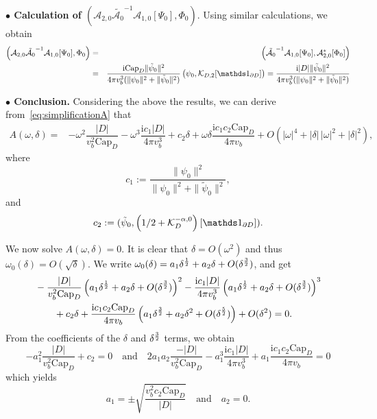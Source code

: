 \documentclass[11pt]{article}
\numberwithin{equation}{section}
\def\ri{{\mathrm{i}}}
\def\capacity{{\mathrm{Cap}}}
\newcommand\1{{\ensuremath {\mathds 1} }}
\def\beas{\begin{eqnarray*}} \def\eeas{\end{eqnarray*}}
\begin{document}
{{\noindent \textbf{$\bullet$ Calculation of  $\left( \mathcal{A}_{2,0}\tilde{\mathcal{A}_0}^{-1}\mathcal{A}_{1,0}[\Psi_0], \Phi_0\right)$}. Using similar calculations, we obtain
\beas
\left( \mathcal{A}_{2,0}\tilde{\mathcal{A}_0}^{-1}\mathcal{A}_{1,0}[\Psi_0], \Phi_0\right) 
&=& \left( \tilde{\mathcal{A}_0}^{-1}\mathcal{A}_{1,0}[\Psi_0], \mathcal{A}_{2,0}^* [\Phi_0]\right) \\
&=&   \f{\ri \capacity_D\|\tilde\psi_0\|^2}{4 \pi v_b^3(\|\psi_0\|^2 +\|\tilde\psi_0\|^2)}  \, \big(\psi_0, \mathcal{K}_{D, 2}[\1_{\p D}] \big) 
= \f{\ri |D|\|\tilde\psi_0\|^2}{4 \pi v_b^3(\|\psi_0\|^2 +\|\tilde\psi_0\|^2)} 
\eeas

\noindent \textbf{$\bullet$ Conclusion.} Considering the above the results, we can derive from~\eqref{eq:simplificationA} that
\begin{equation} \label{eq:Aomegadelta}
\begin{aligned}
A(\omega, \delta) = & - \omega^2 \dfrac{ | D |}{v_b^2 \capacity_D} - \omega^3 \dfrac{\ri c_1 | D |}{4 \pi v_b^3} + c_2\delta + \omega \delta \dfrac{\ri c_1c_2 \capacity_D}{4 \pi v_b}   + O( | \omega |^4 + | \delta | \, |\omega|^2  + | \delta |^2),
\end{aligned}
\end{equation}
where \begin{equation}
c_1:=\frac{\|\psi_0\|^2}{\|\psi_0\|^2+\|\tilde\psi_0\|^2},\end{equation}
and \begin{equation}  \label{defc2}
c_2:=(\tilde\psi_0,\left(1/2 + \mathcal{K}_D^{-\alpha,0}\right)[\1_{\p D}]).\end{equation}


We now solve $A(\omega, \delta) =0$. 
It is clear that $\delta = O(\omega^2)$ and thus $\omega_0(\delta) = O(\sqrt{\delta})$. 
We write 
$
\omega_0(\delta) = a_1 \delta^{\frac{1}{2}} + a_2 \delta + O (\delta^{\frac{3}{2}})
$,
and get
\begin{align*}
	&  -  \dfrac{ | D |}{v_b^2 \capacity_D} \left( a_1 \delta^{\f{1}{2}} + a_2 \delta + O (\delta^{\f{3}{2}}) \right)^2 
	 - \dfrac{\ri c_1 | D |}{4 \pi v_b^3}\left( a_1 \delta^{\f{1}{2}} + a_2 \delta + O (\delta^{\f{3}{2}}) \right)^3 \\
	 & \qquad
	 +c_2 \delta + \dfrac{\ri c_1c_2\capacity_D}{4 \pi v_b}  \left( a_1 \delta^{\f{3}{2}} + a_2 \delta^2 + O (\delta^{\f{5}{2}}) \right) + O(\delta^2) = 0.
\end{align*}
From the coefficients of the $\delta$ and $\delta^{\frac{3}{2}}$ terms, we obtain 
\[
	- a_1^2  \dfrac{| D |}{v_b^2 \capacity_D} + c_2 = 0
	 \quad \text{and} \quad 
	 2 a_1 a_2 \dfrac{- | D |}{v_b^2 \capacity_D} - a_1^3 \dfrac{\ri c_1 | D |}{4\pi v_b^3}  + a_1 \dfrac{\ri c_1c_2\capacity_D}{4 \pi v_b} = 0
\]
which yields 
\[
	a_1 =  \pm \sqrt{ \dfrac{v_b^2 c_2 \capacity_D}{| D |} }
	 \quad \text{and} \quad 
	 a_2 = 0.
\]

}}
\end{document}
